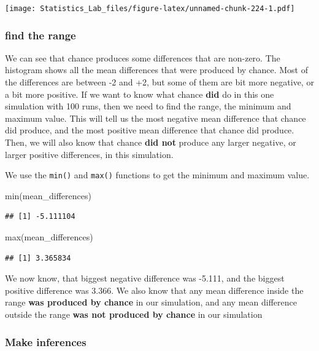 \documentclass[
]{book}
\newenvironment{Shaded}{\begin{snugshade}}{\end{snugshade}}
\newcommand{\FunctionTok}[1]{\textcolor[rgb]{0.00,0.00,0.00}{#1}}
\newcommand{\NormalTok}[1]{#1}
\begin{document}
\texttt{[image: Statistics\_Lab\_files/figure-latex/unnamed-chunk-224-1.pdf]}

\hypertarget{find-the-range}{%
\subsubsection{find the range}\label{find-the-range}}

We can see that chance produces some differences that are non-zero. The histogram shows all the mean differences that were produced by chance. Most of the differences are between -2 and +2, but some of them are bit more negative, or a bit more positive. If we want to know what chance \textbf{did} do in this one simulation with 100 runs, then we need to find the range, the minimum and maximum value. This will tell us the most negative mean difference that chance did produce, and the most positive mean difference that chance did produce. Then, we will also know that chance \textbf{did not} produce any larger negative, or larger positive differences, in this simulation.

We use the \texttt{min()} and \texttt{max()} functions to get the minimum and maximum value.

\begin{Shaded}
\begin{Highlighting}[]
\FunctionTok{min}\NormalTok{(mean\_differences)}
\end{Highlighting}
\end{Shaded}

\begin{verbatim}
## [1] -5.111104
\end{verbatim}

\begin{Shaded}
\begin{Highlighting}[]
\FunctionTok{max}\NormalTok{(mean\_differences)}
\end{Highlighting}
\end{Shaded}

\begin{verbatim}
## [1] 3.365834
\end{verbatim}

We now know, that biggest negative difference was -5.111, and the biggest positive difference was 3.366. We also know that any mean difference inside the range \textbf{was produced by chance} in our simulation, and any mean difference outside the range \textbf{was not produced by chance} in our simulation

\hypertarget{make-inferences}{%
\subsubsection{Make inferences}\label{make-inferences}}
\end{document}

